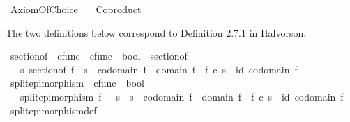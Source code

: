%
\begin{isabellebody}%
%
%
\isadelimdocument
%
\endisadelimdocument
%
\isatagdocument
%
\isamarkuptrue%
%
\endisatagdocument
{\isafolddocument}%
%
\isadelimdocument
%
\endisadelimdocument
%
\isadelimtheory
%
\endisadelimtheory
%
\isatagtheory
{}\isamarkupfalse%
\ Axiom{\isacharunderscore}{\kern0pt}Of{\isacharunderscore}{\kern0pt}Choice\isanewline
\ \ \ Coproduct\isanewline
{}%
\endisatagtheory
{\isafoldtheory}%
%
\isadelimtheory
%
\endisadelimtheory
%
\begin{isamarkuptext}%
The two definitions below correspond to Definition 2.7.1 in Halvorson.%
\end{isamarkuptext}\isamarkuptrue%
\isamarkupfalse%
\ section{\isacharunderscore}{\kern0pt}of\ {\isacharcolon}{\kern0pt}{\isacharcolon}{\kern0pt}\ {\isachardoublequoteopen}cfunc\ {\isasymRightarrow}\ cfunc\ {\isasymRightarrow}\ bool{\isachardoublequoteclose}\ {\isacharparenleft}{\kern0pt}\ {\isachardoublequoteopen}sectionof{\isachardoublequoteclose}\ {}{}{\isacharparenright}{\kern0pt}\isanewline
\ \ \ {\isachardoublequoteopen}s\ sectionof\ f\ {\isasymlongleftrightarrow}\ s\ {\isacharcolon}{\kern0pt}\ codomain\ f\ {\isasymrightarrow}\ domain\ f\ {\isasymand}\ f\ {\isasymcirc}\isactrlsub c\ s\ {\isacharequal}{\kern0pt}\ id\ {\isacharparenleft}{\kern0pt}codomain\ f{\isacharparenright}{\kern0pt}{\isachardoublequoteclose}\isanewline
\isanewline
{}\isamarkupfalse%
\ split{\isacharunderscore}{\kern0pt}epimorphism\ {\isacharcolon}{\kern0pt}{\isacharcolon}{\kern0pt}\ {\isachardoublequoteopen}cfunc\ {\isasymRightarrow}\ bool{\isachardoublequoteclose}\isanewline
\ \ \ {\isachardoublequoteopen}split{\isacharunderscore}{\kern0pt}epimorphism\ f\ {\isasymlongleftrightarrow}\ {\isacharparenleft}{\kern0pt}{\isasymexists}\ s{\isachardot}{\kern0pt}\ \ s\ {\isacharcolon}{\kern0pt}\ codomain\ f\ {\isasymrightarrow}\ domain\ f\ {\isasymand}\ f\ {\isasymcirc}\isactrlsub c\ s\ {\isacharequal}{\kern0pt}\ id\ {\isacharparenleft}{\kern0pt}codomain\ f{\isacharparenright}{\kern0pt}{\isacharparenright}{\kern0pt}{\isachardoublequoteclose}\isanewline
\isanewline
{}\isamarkupfalse%
\ split{\isacharunderscore}{\kern0pt}epimorphism{\isacharunderscore}{\kern0pt}def{}{\isacharcolon}{\kern0pt}\ \isanewline

\end{isabellebody}
